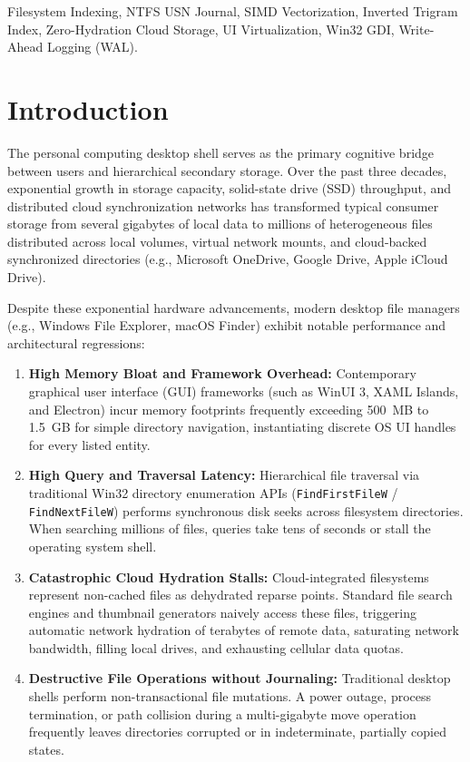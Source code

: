 \documentclass[conference]{IEEEtran}
\begin{document}
\begin{IEEEkeywords}
Filesystem Indexing, NTFS USN Journal, SIMD Vectorization, Inverted Trigram Index, Zero-Hydration Cloud Storage, UI Virtualization, Win32 GDI, Write-Ahead Logging (WAL).
\end{IEEEkeywords}

\section{Introduction}

The personal computing desktop shell serves as the primary cognitive bridge between users and hierarchical secondary storage. Over the past three decades, exponential growth in storage capacity, solid-state drive (SSD) throughput, and distributed cloud synchronization networks has transformed typical consumer storage from several gigabytes of local data to millions of heterogeneous files distributed across local volumes, virtual network mounts, and cloud-backed synchronized directories (e.g., Microsoft OneDrive, Google Drive, Apple iCloud Drive).

Despite these exponential hardware advancements, modern desktop file managers (e.g., Windows File Explorer, macOS Finder) exhibit notable performance and architectural regressions:
\begin{enumerate}
    \item \textbf{High Memory Bloat and Framework Overhead:} Contemporary graphical user interface (GUI) frameworks (such as WinUI 3, XAML Islands, and Electron) incur memory footprints frequently exceeding 500~MB to 1.5~GB for simple directory navigation, instantiating discrete OS UI handles for every listed entity.
    \item \textbf{High Query and Traversal Latency:} Hierarchical file traversal via traditional Win32 directory enumeration APIs (\texttt{FindFirstFileW} / \texttt{FindNextFileW}) performs synchronous disk seeks across filesystem directories. When searching millions of files, queries take tens of seconds or stall the operating system shell.
    \item \textbf{Catastrophic Cloud Hydration Stalls:} Cloud-integrated filesystems represent non-cached files as dehydrated reparse points. Standard file search engines and thumbnail generators naively access these files, triggering automatic network hydration of terabytes of remote data, saturating network bandwidth, filling local drives, and exhausting cellular data quotas.
    \item \textbf{Destructive File Operations without Journaling:} Traditional desktop shells perform non-transactional file mutations. A power outage, process termination, or path collision during a multi-gigabyte move operation frequently leaves directories corrupted or in indeterminate, partially copied states.
\end{enumerate}
\end{document}
